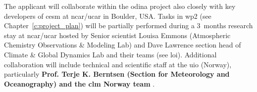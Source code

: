 The applicant will collaborate within the \gls{odina} project also closely with key developers of \gls{cesm} at \gls{ncar}/\gls{ucar} in Boulder, USA. Tasks in \gls{wp}2 (see Chapter~\ref{c:project_plan}) will be partially performed during a 3~months research stay at \gls{ncar}/\gls{ucar} hosted by Senior scientist Louisa Emmons (Atmospheric Chemistry Observations \& Modeling Lab) and Dave Lawrence section head of Climate \& Global Dynamics Lab and their teams (see \gls{loi}). Additional collaboration will include technical and scientific staff at the \gls{uio} (Norway), particularly \textbf{\color{blue} Prof. Terje K. Berntsen (Section for Meteorology and Oceanography) and the \gls{clm} Norway team }. 
